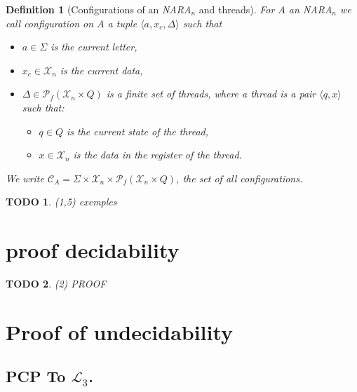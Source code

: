 \documentclass[a4paper,10pt]{report}
\newtheorem{df}{Definition}
\newtheorem{td}{TODO}
\newcommand{\C}{\mathcal{C}_{A}}
\newcommand{\X}{\mathcal{X}_{n}}
\newcommand{\Lt}{$\mathcal{L}_{3}$}
\begin{document}
\begin{df}[Configurations of an \textit{NARA}$_n$ and threads]
For $A$ an \textit{NARA}$_n$ we call configuration on $A$ a tuple  
 $\langle  a ,x_c, \Delta    \rangle$
 such that 
  \begin{itemize}
    \item $a \in \Sigma$ is the current letter, 
    \item $x_c\in  \X$ is the current data, 
    \item $\Delta \in \mathcal{P}_f(\X \times Q)$ is a finite set of threads, where a thread is a pair  
    $\langle q,x  \rangle$ such that:
      \begin{itemize}
	\item $q \in Q$ is the current state of the thread,
	\item $x\in  \X $ is the data in the register of the thread.
      \end{itemize}
   \end{itemize}
 We write $\C =  \Sigma \times \X \times \mathcal{P}_f(\X \times Q)$, the set of all configurations.
\end{df}

\begin{td} (1,5)
  exemples
\end{td}

\section{proof decidability} 

\begin{td} (2)
  PROOF
\end{td}

\section{Proof of undecidability}
\subsection{PCP To \Lt.}
\end{document}
